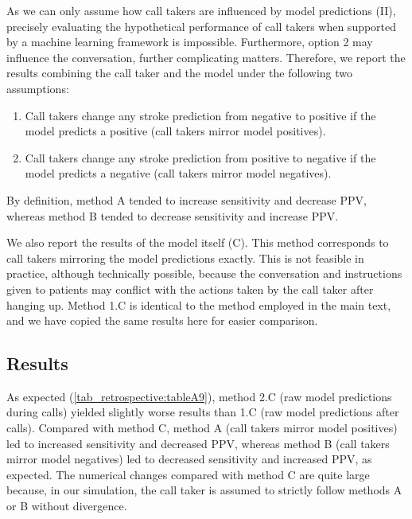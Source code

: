 {As we can only assume how call takers are influenced by model predictions (II), precisely evaluating the hypothetical performance of call takers when supported by a machine learning framework is impossible. Furthermore, option 2 may influence the conversation, further complicating matters. Therefore, we report the results combining the call taker and the model under the following two assumptions:
%
\begin{enumerate}[label=\Alph*.]
    \item Call takers change any stroke prediction from negative to positive if the model predicts a positive (call takers mirror model positives).
    \item Call takers change any stroke prediction from positive to negative if the model predicts a negative (call takers mirror model negatives).
\end{enumerate}
%
By definition, method A tended to increase sensitivity and decrease PPV, whereas method B tended to decrease sensitivity and increase PPV.

We also report the results of the model itself (C). This method corresponds to call takers mirroring the model predictions exactly. This is not feasible in practice, although technically possible, because the conversation and instructions given to patients may conflict with the actions taken by the call taker after hanging up. Method 1.C is identical to the method employed in the main text, and we have copied the same results here for easier comparison.


\subsection{Results}

As expected (\cref{tab_retrospective:tableA9}), method 2.C (raw model predictions during calls) yielded slightly worse results than 1.C (raw model predictions after calls). Compared with method C, method A (call takers mirror model positives) led to increased sensitivity and decreased PPV, whereas method B (call takers mirror model negatives) led to decreased sensitivity and increased PPV, as expected. The numerical changes compared with method C are quite large because, in our simulation, the call taker is assumed to strictly follow methods A or B without divergence.

\begin{table}[h]
    \centering
    \caption{Overall performance of model, call takers and simulated combinations of model and call takers on MH-1813 test data.}
    \label{tab_retrospective:tableA9}
\end{table}}
